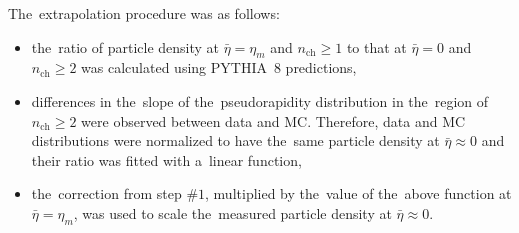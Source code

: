 The~extrapolation procedure was as follows:
\begin{itemize} 
		\item the~ratio of particle density at $\bar{\eta}=\eta_{m}$ and $n_\textrm{ch}\geq1$ to that at $\bar{\eta}=0$ and $n_\textrm{ch}\geq2$ was calculated using PYTHIA~8 predictions,
		\item differences in the~slope of the~pseudorapidity distribution in the~region of $n_\textrm{ch}\geq2$ were observed between data and MC. Therefore, data and MC distributions were normalized to have the~same particle density at  $\bar{\eta}\approx 0$ and their ratio was fitted with
		a~linear function,
		
		\item  the~correction from step $\#1$,  multiplied by the~value of the~above function at $\bar{\eta}=\eta_{m}$, was used to scale the~measured particle density at $\bar{\eta}\approx0$. 
	
\end{itemize}

